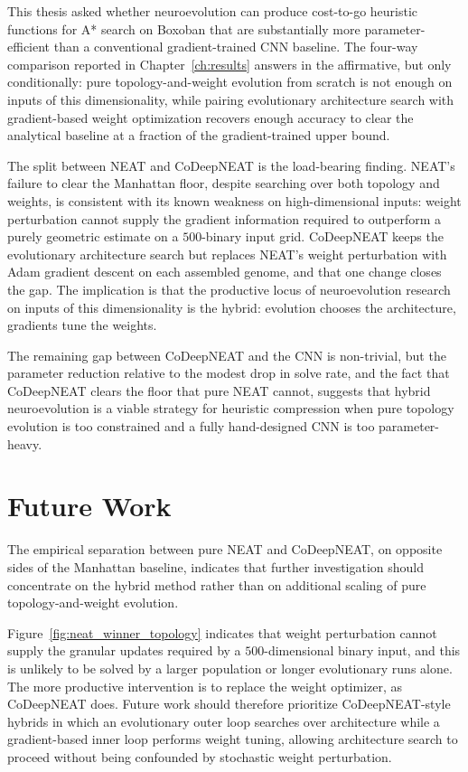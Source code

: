This thesis asked whether neuroevolution can produce cost-to-go heuristic functions
for A* search on Boxoban that are substantially more parameter-efficient than a
conventional gradient-trained CNN baseline. The four-way comparison reported in
Chapter~\ref{ch:results} answers in the affirmative, but only conditionally: pure
topology-and-weight evolution from scratch is not enough on inputs of this
dimensionality, while pairing evolutionary architecture search with gradient-based
weight optimization recovers enough accuracy to clear the analytical baseline at a
fraction of the gradient-trained upper bound.

The split between NEAT and CoDeepNEAT is the load-bearing finding. NEAT's failure
to clear the Manhattan floor, despite searching over both topology and weights,
is consistent with its known weakness on high-dimensional inputs: weight
perturbation cannot supply the gradient information required to outperform a
purely geometric estimate on a $500$-binary input grid. CoDeepNEAT keeps the
evolutionary architecture search but replaces NEAT's weight perturbation with
Adam gradient descent on each assembled genome, and that one change closes the
gap. The
implication is that the productive locus of neuroevolution research on inputs of
this dimensionality is the hybrid: evolution chooses the architecture, gradients
tune the weights.

The remaining gap between CoDeepNEAT and the CNN is non-trivial, but the
parameter reduction relative to the modest drop in solve rate, and the fact that
CoDeepNEAT clears the floor that pure NEAT cannot, suggests that hybrid
neuroevolution is a viable strategy for heuristic compression when pure topology
evolution is too constrained and a fully hand-designed CNN is too parameter-heavy.

\section{Future Work}

The empirical separation between pure NEAT and CoDeepNEAT, on opposite sides of the
Manhattan baseline, indicates that further investigation should concentrate on the
hybrid method rather than on additional scaling of pure topology-and-weight evolution.

Figure~\ref{fig:neat_winner_topology} indicates that weight perturbation cannot supply the granular updates required by a $500$-dimensional binary input, and this is unlikely to be solved by a larger population or longer evolutionary runs alone. The more
productive intervention is to replace the weight optimizer, as CoDeepNEAT does.
Future work should therefore prioritize CoDeepNEAT-style hybrids in which an
evolutionary outer loop searches over architecture while a gradient-based inner loop
performs weight tuning, allowing architecture search to proceed without being confounded
by stochastic weight perturbation.

